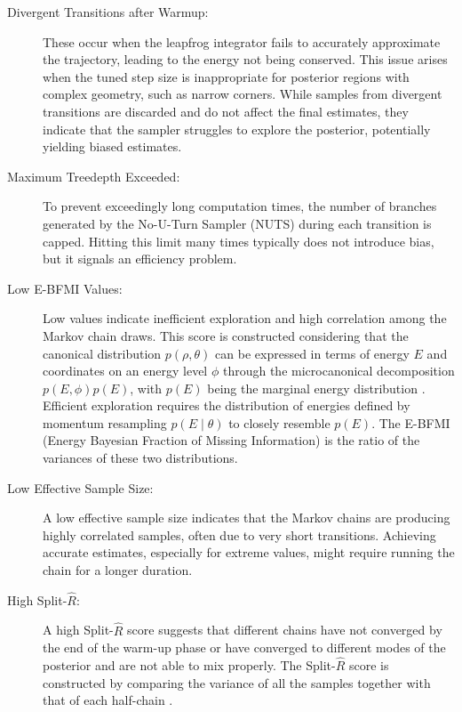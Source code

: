 \begin{description}
\item[Divergent Transitions after Warmup:] These occur when the leapfrog integrator fails to accurately approximate the
  trajectory, leading to the energy not being conserved. This issue arises when the tuned step size is inappropriate for posterior regions with complex geometry, such as narrow corners. While samples from divergent transitions are discarded and do not affect the final estimates, they indicate that the sampler struggles to explore the posterior, potentially yielding biased estimates.
\item[Maximum Treedepth Exceeded:] To prevent exceedingly long computation times, the number of branches generated by the No-U-Turn Sampler (NUTS) during each transition is capped. Hitting this limit many times typically does not introduce bias, but it signals an efficiency problem.

\item[Low E-BFMI Values:] Low values indicate inefficient exploration and high correlation among the Markov chain draws.
  This score is constructed considering that the canonical distribution $p(\rho, \theta)$ can be expressed in terms of
  energy $E$ and coordinates on an energy level $\phi$ through the microcanonical decomposition $p(E, \phi) p(E)$, with
  $p(E)$ being the marginal energy distribution \cite{betancourt2016diagnosing}. Efficient exploration requires the distribution of energies defined by momentum resampling $p(E\mid \theta)$ to closely resemble $p(E)$. The E-BFMI (Energy Bayesian Fraction of Missing Information) is the ratio of the variances of these two distributions.

\item[Low Effective Sample Size:] A low effective sample size indicates that the Markov chains are producing highly
  correlated samples, often due to very short transitions. Achieving accurate estimates, especially for extreme values,
  might require running the chain for a longer duration.

\item[High Split-$\hat{R}$:] A high Split-$\hat{R}$ score suggests that different chains have not converged by the end
  of the warm-up phase or have converged to different modes of the posterior and are not able to mix properly. The
  Split-$\hat{R}$ score is constructed by comparing the variance of all the samples together with that of each
  half-chain \cite{vehtari2021rank}.
\end{description}

